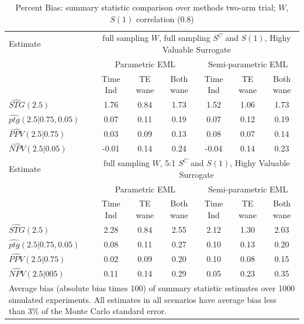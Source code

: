 \documentclass[times, 11pt]{article}
\begin{document}
\begin{table} [H]
\caption{Percent Bias: summary statistic comparison over methods two-arm trial; $W$, $S(1)$ correlation (0.8)}
\begin{tabular}{l|ccc|ccc|}
\hline
Estimate&\multicolumn{6}{|c|}{full sampling $W$, full sampling $S^{C}$ and $S(1)$, Highy Valuable Surrogate}\\
&\multicolumn{3}{|c|}{Parametric EML}&\multicolumn{3}{|c|}{Semi-parametric EML}\\
&Time Ind&TE wane&Both wane&Time Ind&TE wane&Both wane\\
\hline
$\widehat{STG}(2.5)$&1.76 & 0.84 & 1.73 & 1.52 & 1.06 & 1.73  \\ 
$\widehat{ptg}(2.5|0.75, 0.05)$&0.07 & 0.11 & 0.19 & 0.07 & 0.12 & 0.19 \\ 
$\widehat{PPV}(2.5|0.75)$&0.03 & 0.09 & 0.13 & 0.08 & 0.07 & 0.14 \\ 
$\widehat{NPV}(2.5|0.05)$&-0.01 & 0.14 & 0.24 & -0.04 & 0.14 & 0.23  \\ 
\hline
\hline
Estimate&\multicolumn{6}{|c|}{full sampling $W$, 5:1 $S^{C}$ and $S(1)$, Highy Valuable Surrogate}\\
&\multicolumn{3}{|c|}{Parametric EML}&\multicolumn{3}{|c|}{Semi-parametric EML}\\
&Time Ind&TE wane&Both wane&Time Ind&TE wane&Both wane\\
\hline
$\widehat{STG}(2.5)$&2.28 & 0.84 & 2.55 & 2.12 & 1.30 & 2.03  \\ 
$\widehat{ptg}(2.5|0.75, 0.05)$&  0.08 & 0.11 & 0.27 & 0.10 & 0.13 & 0.20  \\ 
$\widehat{PPV}(2.5|0.75)$&  0.02 & 0.09 & 0.20 & 0.10 & 0.08 & 0.15 \\ 
$\widehat{NPV}(2.5|005)$&  0.11 & 0.14 & 0.29 & 0.05 & 0.23 & 0.35 \\ 
\hline
\multicolumn{7}{p{9in}}{Average bias (absolute bias times 100) of summary statistic estimates over 1000 simulated experiments. All estimates in all scenarios have average bias less than 3\% of the Monte Carlo standard error.}
\end{tabular}
\end{table}
\end{document}
